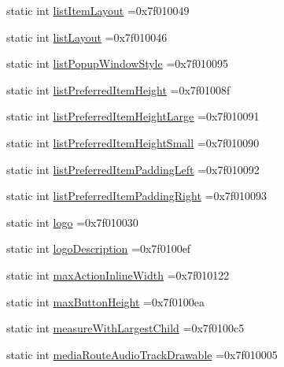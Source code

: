 \begin{DoxyCompactItemize}
static int \hyperlink{classandroid_1_1support_1_1v4_1_1R_1_1attr_ac152e1975a0059d413c9b97ed9841b7b}{list\+Item\+Layout} =0x7f010049
\item 
static int \hyperlink{classandroid_1_1support_1_1v4_1_1R_1_1attr_aaa4f60da265ec9c98e41d06c2da774fc}{list\+Layout} =0x7f010046
\item 
static int \hyperlink{classandroid_1_1support_1_1v4_1_1R_1_1attr_a88bbcdcadb337104abf92ae2375b91a4}{list\+Popup\+Window\+Style} =0x7f010095
\item 
static int \hyperlink{classandroid_1_1support_1_1v4_1_1R_1_1attr_abbfb3f850012a18672cf64597dc0b519}{list\+Preferred\+Item\+Height} =0x7f01008f
\item 
static int \hyperlink{classandroid_1_1support_1_1v4_1_1R_1_1attr_afdf6a597b54d03b67c21dc646bc1e2da}{list\+Preferred\+Item\+Height\+Large} =0x7f010091
\item 
static int \hyperlink{classandroid_1_1support_1_1v4_1_1R_1_1attr_a58ffbc1e4aa9d5fc75bba3f966c39df2}{list\+Preferred\+Item\+Height\+Small} =0x7f010090
\item 
static int \hyperlink{classandroid_1_1support_1_1v4_1_1R_1_1attr_a9a8582bc6e567f1987e92f27316b6abf}{list\+Preferred\+Item\+Padding\+Left} =0x7f010092
\item 
static int \hyperlink{classandroid_1_1support_1_1v4_1_1R_1_1attr_a5ad6e202e34a514ac5dcd675d76d5062}{list\+Preferred\+Item\+Padding\+Right} =0x7f010093
\item 
static int \hyperlink{classandroid_1_1support_1_1v4_1_1R_1_1attr_a5b5fc6d210aa9218c697c43ca20f6fdf}{logo} =0x7f010030
\item 
static int \hyperlink{classandroid_1_1support_1_1v4_1_1R_1_1attr_ae318038205e8027efc855eeed3816ce1}{logo\+Description} =0x7f0100ef
\item 
static int \hyperlink{classandroid_1_1support_1_1v4_1_1R_1_1attr_abbf94baaafc982699ebdb3912a8c0a65}{max\+Action\+Inline\+Width} =0x7f010122
\item 
static int \hyperlink{classandroid_1_1support_1_1v4_1_1R_1_1attr_a1e32c821f0577ed221f1e619a58ef17b}{max\+Button\+Height} =0x7f0100ea
\item 
static int \hyperlink{classandroid_1_1support_1_1v4_1_1R_1_1attr_a3fab112fbf63d1e882afbe1b156b4cb0}{measure\+With\+Largest\+Child} =0x7f0100c5
\item 
static int \hyperlink{classandroid_1_1support_1_1v4_1_1R_1_1attr_a8a7b4a004619085258ac2ba5cf483af6}{media\+Route\+Audio\+Track\+Drawable} =0x7f010005
\item 

\end{DoxyCompactItemize}
